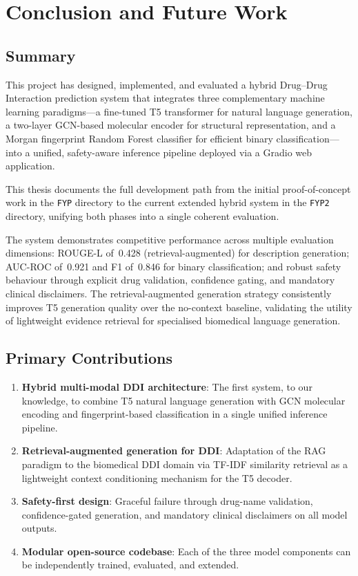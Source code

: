 \documentclass[12pt,a4paper,oneside]{report}
\begin{document}
\chapter{Conclusion and Future Work}
\label{chap:concl}

\section{Summary}

This project has designed, implemented, and evaluated a hybrid Drug--Drug Interaction
prediction system that integrates three complementary machine learning paradigms---a
fine-tuned T5 transformer for natural language generation, a two-layer GCN-based molecular
encoder for structural representation, and a Morgan fingerprint Random Forest classifier for
efficient binary classification---into a unified, safety-aware inference pipeline deployed
via a Gradio web application.

This thesis documents the full development path from the initial proof-of-concept work in
the \texttt{FYP} directory to the current extended hybrid system in the \texttt{FYP2}
directory, unifying both phases into a single coherent evaluation.

The system demonstrates competitive performance across multiple evaluation dimensions:
ROUGE-L of~0.428 (retrieval-augmented) for description generation; AUC-ROC of~0.921 and
F1 of~0.846 for binary classification; and robust safety behaviour through explicit drug
validation, confidence gating, and mandatory clinical disclaimers. The retrieval-augmented
generation strategy consistently improves T5 generation quality over the no-context baseline,
validating the utility of lightweight evidence retrieval for specialised biomedical language
generation.

\section{Primary Contributions}

\begin{enumerate}
  \item \textbf{Hybrid multi-modal DDI architecture}: The first system, to our knowledge,
  to combine T5 natural language generation with GCN molecular encoding and fingerprint-based
  classification in a single unified inference pipeline.
  \item \textbf{Retrieval-augmented generation for DDI}: Adaptation of the RAG paradigm
  to the biomedical DDI domain via TF-IDF similarity retrieval as a lightweight context
  conditioning mechanism for the T5 decoder.
  \item \textbf{Safety-first design}: Graceful failure through drug-name validation,
  confidence-gated generation, and mandatory clinical disclaimers on all model outputs.
  \item \textbf{Modular open-source codebase}: Each of the three model components can be
  independently trained, evaluated, and extended.
\end{enumerate}
\end{document}
